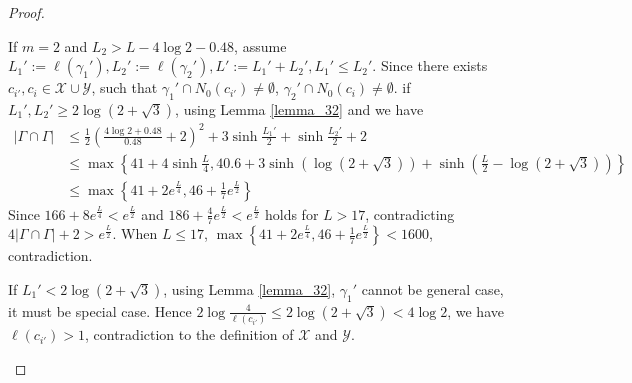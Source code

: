 \documentclass[11pt, a4paper]{article}
\theoremstyle{definition}
\theoremstyle{remark}
\newcommand{\calx}{\mathcal{X}}
\newcommand{\caly}{\mathcal{Y}}
\newcommand{\abs}[1]{\left| #1 \right|}
\newcommand{\bracket}[1]{\left( #1 \right)}
\begin{document}
\begin{proof}
\begin{enumerate}

If $m=2$ and $L_2>L-4\log2-0.48$, assume $L_1':=\ell(\gamma_1'), L_2':=\ell(\gamma_2'), L':=L_1'+L_2', L_1'\leqslant L_2'$. Since there exists $c_{i'},c_i\in\calx\cup\caly$, such that $\gamma_1'\cap N_0(c_{i'})\neq\emptyset$, $\gamma_2'\cap N_0(c_{i})\neq\emptyset$. if $L_1',L_2'\geqslant2\log(2+\sqrt3)$, 
using Lemma \ref{lemma_32} and \cite[Lemma 2.5]{Y2805} we have
\begin{align*}
 \abs{\Gamma\cap\Gamma}&\leqslant\frac12\bracket{\frac{4\log2+0.48}{0.48}+2}^2+3\sinh{\frac{L_1'}2}+\sinh\frac{L_2'}2+2\\
&\leqslant\max\left\{41+4\sinh{\frac{L}4}, 40.6+3\sinh(\log(2+\sqrt3))+\sinh\bracket{\frac{L}2-\log(2+\sqrt3)}\right\}\\
&\leqslant\max\left\{41+2e^{\frac{L}4}, 46+\frac17e^{\frac{L}2}\right\}
\end{align*}
Since $166+8e^{\frac{L}4}<e^{\frac{L}2}$ and $186+\frac47e^{\frac{L}2}<e^{\frac{L}2}$ holds for $L>17$, contradicting $4\abs{\Gamma\cap\Gamma}+2>e^{\frac{L}2}$. When $L\leqslant17$, $\max\left\{41+2e^{\frac{L}4}, 46+\frac17e^{\frac{L}2}\right\}<1600$, contradiction.

If $L_1'<2\log(2+\sqrt3)$, using Lemma \ref{lemma_32}, $\gamma_1'$ cannot be general case, it must be special case. Hence $2\log\frac4{\ell(c_{i'})}\leqslant2\log(2+\sqrt3)<4\log2$, we have $\ell(c_{i'})>1$, contradiction to the definition of $\calx$ and $\caly$.




\end{enumerate}
\end{proof}
\end{document}

